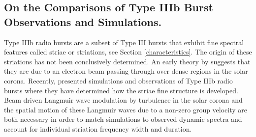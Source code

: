 \subsection{On the Comparisons of Type IIIb Burst Observations and Simulations.}
Type IIIb radio bursts are a subset of Type III bursts that exhibit fine spectral features called striae or striations, see Section \ref{characteristics}. The origin of these striations has not been conclusively determined. An early theory by \cite{Takakura1975} suggests that they are due to an electron beam passing through over dense regions in the solar corona. Recently, \cite{Reid2021} presented simulations and observations of Type IIIb radio bursts where they have determined how the striae fine structure is developed. Beam driven Langmuir wave modulation by turbulence in the solar corona and the spatial motion of these Langmuir waves due to a non-zero group velocity are both necessary in order to match simulations to observed dynamic spectra and account for individual striation frequency width and duration.

